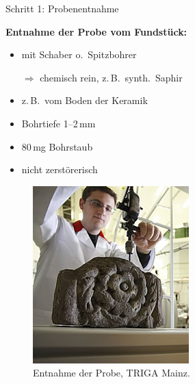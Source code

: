 \documentclass[xcolor=x11names, aspectratio=169]{beamer}
\begin{document}
\begin{frame}{Schritt 1: Probenentnahme}
\begin{minipage}{0.56\textwidth}\flushleft
\textbf{Entnahme der Probe vom Fundstück:}\smallskip

\begin{itemize}
\item mit Schaber o.\ Spitzbohrer

$\Rightarrow$ chemisch rein, z.\,B.\ synth.\ Saphir
\item z.\,B.\ vom Boden der Keramik
\item Bohrtiefe 1--2\,mm
\item 80\,mg \alert{Bohrstaub}
\item \glqq nicht zerstörerisch\grqq
\end{itemize}
\end{minipage}\hfill
\begin{minipage}{0.4\textwidth}
\begin{figure}
\includegraphics[width=.8\textwidth]{img/drill.jpg}
\caption{Entnahme der Probe, TRIGA Mainz.}
\end{figure}
\end{minipage}
\end{frame}
\end{document}
